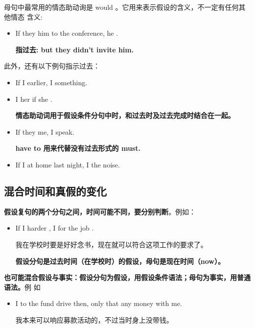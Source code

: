 母句中最常用的情态助动询是 would 。它用来表示假设的含义，不一定有任何其他情态
含义:
\begin{itemize}
\item If they  him to the conference, he .

  \textbf{指过去: but they didn't invite him.}
\end{itemize}

此外，还有以下例句指示过去：
\begin{itemize}
\item If I  earlier, I  something.

\item I  her if she .

  \textbf{情态助动词用于假设条件分句中时，和过去时及过去完成时结合在一起。}

\item If they  me, I  speak.

  \textbf{have to 用来代替没有过去形式的 must.}

\item If I  at home last night, I  the noise.
\end{itemize}


\subsection{混合时间和真假的变化}

\textbf{假设复句的两个分句之间，时间可能不同，要分别判断}。例如：
\begin{itemize}
\item If I  harder , I  for the job
  .

  我在学校时要是好好念书，现在就可以符合这项工作的要求了。

  \textbf{假设分句是过去时间（在学校时）的假设，母句是现在时间（now）。}
\end{itemize}

\textbf{也可能混合假设与事实：假设分句为假设，用假设条件语法；母句为事实，用普通语法。}例
如

\begin{itemize}
\item I  to the fund drive then, only that  any money with me.

  我本来可以响应募款活动的，不过当时身上没带钱。
\end{itemize}

